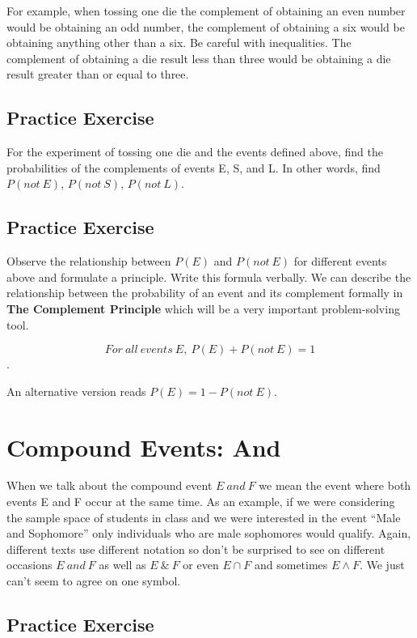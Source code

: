 \documentclass[]{book}
\theoremstyle{definition}
\theoremstyle{definition}
\theoremstyle{definition}
\theoremstyle{remark}
\begin{document}
For example, when tossing one die the complement of obtaining an even
number would be obtaining an odd number, the complement of obtaining a
six would be obtaining anything other than a six. Be careful with
inequalities. The complement of obtaining a die result less than three
would be obtaining a die result greater than or equal to three.

\subsection{Practice Exercise}\label{practice-exercise-1}

For the experiment of tossing one die and the events defined above, find
the probabilities of the complements of events E, S, and L. In other
words, find \(P(not \ E)\), \(P(not \ S)\), \(P(not \ L)\).

\subsection{Practice Exercise}\label{practice-exercise-2}

Observe the relationship between \(P(E)\) and \(P(not \ E)\) for
different events above and formulate a principle. Write this formula
verbally. We can describe the relationship between the probability of an
event and its complement formally in \textbf{The Complement Principle}
which will be a very important problem-solving tool.

\[For \ all \ events \ E, \ P(E) + P(not \ E) = 1\].

An alternative version reads \(P(E) = 1 - P(not \ E)\).

\section{Compound Events: And}\label{compound_events_and}

When we talk about the compound event \(E \ and \ F\) we mean the event
where both events E and F occur at the same time. As an example, if we
were considering the sample space of students in class and we were
interested in the event ``Male and Sophomore'' only individuals who are
male sophomores would qualify. Again, different texts use different
notation so don't be surprised to see on different occasions
\(E \ and \ F\) as well as \(E \ \& \ F\) or even \(E∩F\) and sometimes
\(E \wedge F\). We just can't seem to agree on one symbol.

\subsection{Practice Exercise}\label{practice-exercise-3}
\end{document}
